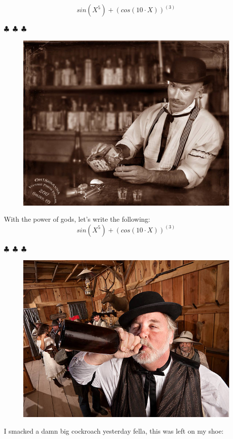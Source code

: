 \documentclass{article}
\begin{document}
\begin{equation}
{{sin{({{X}^{5}})}}+{{({cos{({{10}\cdot{X}})}})}^{({3})}}}
\end{equation}
\begin{center} $\clubsuit$~$\clubsuit$~$\clubsuit$ \end{center}\begin{figure}[H] \includegraphics[scale=0.3]{funny_pics/bartender.jpg} \end{figure} With the power of gods, let's write the following: 
\begin{equation}
{{sin{({{X}^{5}})}}+{{({cos{({{10}\cdot{X}})}})}^{({3})}}}
\end{equation}
\begin{center} $\clubsuit$~$\clubsuit$~$\clubsuit$ \end{center}\begin{figure}[H] \includegraphics[scale=1.4]{funny_pics/drunk_cowboy.jpg} \end{figure} I smacked a damn big cockroach yesterday fella, this was left on my shoe: 
\end{document}
